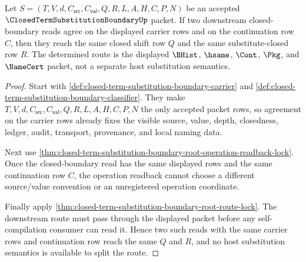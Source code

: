 \begin{theorem}
\label{thm:closed-term-substitution-boundary-route-determinacy}
Let $S=(T,V,d,C_{\mathsf{src}},C_{\mathsf{val}},Q,R,L,A,H,C,P,N)$ be an accepted $\ClosedTermSubstitutionBoundaryUp$ packet. If two downstream closed-boundary reads agree on the displayed carrier rows and on the continuation row $C$, then they reach the same closed shift row $Q$ and the same substitute-closed row $R$. The determined route is the displayed $\BHist$, $\hsame$, $\Cont$, $\Pkg$, and $\NameCert$ packet, not a separate host substitution semantics.
\end{theorem}
\begin{proof}
Start with \autoref{def:closed-term-substitution-boundary-carrier} and \autoref{def:closed-term-substitution-boundary-classifier}. They make $T,V,d,C_{\mathsf{src}},C_{\mathsf{val}},Q,R,L,A,H,C,P,N$ the only accepted packet rows, so agreement on the carrier rows already fixes the visible source, value, depth, closedness, ledger, audit, transport, provenance, and local naming data.

Next use \autoref{thm:closed-term-substitution-boundary-root-operation-readback-lock}. Once the closed-boundary read has the same displayed rows and the same continuation row $C$, the operation readback cannot choose a different source/value convention or an unregistered operation coordinate.

Finally apply \autoref{thm:closed-term-substitution-boundary-root-route-lock}. The downstream route must pass through the displayed packet before any self-compilation consumer can read it. Hence two such reads with the same carrier rows and continuation row reach the same $Q$ and $R$, and no host substitution semantics is available to split the route.
\end{proof}

